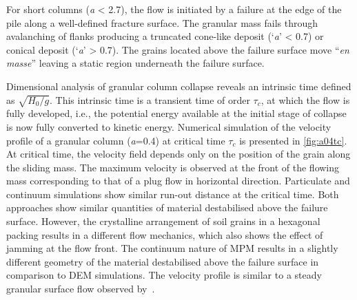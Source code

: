 For short columns (\textit{a} < 2.7), the flow is initiated 
by a failure at the edge of the pile along a well-defined fracture surface.
The granular mass fails through avalanching of flanks producing a 
truncated cone-like deposit (`\textit{a}' < 0.7) or conical deposit 
(`\textit{a}' > 0.7). The grains located above the failure surface move 
``\textit{en masse}'' leaving a static region underneath the failure surface. 

Dimensional analysis of granular column collapse reveals an intrinsic time 
defined as $\sqrt{H_{\textit{0}}/g}$. This intrinsic time is a transient time 
of order $\tau_{c}$, at which the flow is fully developed, i.e., the potential 
energy available at the initial stage of collapse is now fully converted to 
kinetic energy. Numerical simulation of the velocity profile of a granular 
column (\textit{a}=0.4) at critical time $\tau_{c}$ is presented in 
\cref{fig:a04tc}. 
At critical time, the velocity field depends only on the position of the grain 
along the sliding mass. The maximum velocity is observed at the front of the 
flowing mass corresponding to that of a plug flow in horizontal direction. 
Particulate and continuum simulations show similar run-out distance at the 
critical time. Both approaches show similar quantities of material 
destabilised above the failure surface. However, the crystalline arrangement of 
soil grains in a hexagonal packing results in a different flow mechanics, which 
also shows the effect of jamming at the flow front. The continuum nature of MPM 
results in a slightly different geometry of the material destabilised above the 
failure surface in comparison to DEM simulations. The velocity profile is 
similar to a steady granular surface flow observed by~\citet{Lajeunesse2004}. 

